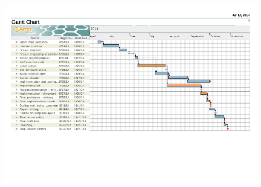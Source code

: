 \documentclass[a4paper,12pt]{article}
\begin{document}


\begin{landscape}
\appendix
\begin{figure}[H]
\centering
\includegraphics[width=\linewidth]{ganttchart}
\end{figure}
\end{landscape}
\end{document}
